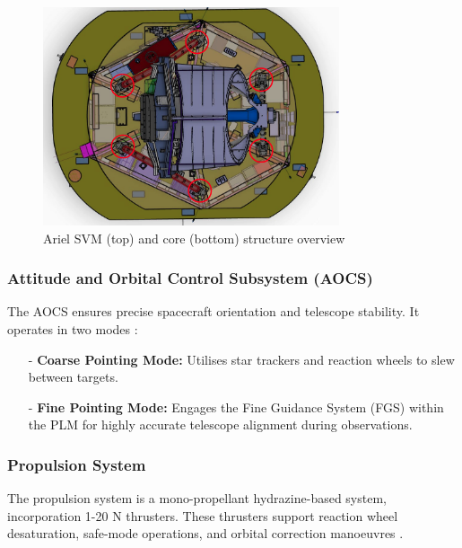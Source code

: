 \documentclass[12pt]{article}
\begin{document}
\begin{figure}[H]
\begin{minipage}{.4\textwidth}
        \vfill
        \includegraphics[width=\linewidth]{ariel core2.png}
    \end{minipage}
    \caption{\centering Ariel SVM (top) and core (bottom) structure overview \protect\cite{salvignol2024ariel}}
    \label{fig:16}
\end{figure}

\subsubsection{Attitude and Orbital Control Subsystem (AOCS)} \label{sec:4.1.2}

The AOCS ensures precise spacecraft orientation and telescope stability. It operates in two modes \cite{arielassessreport}:

\begin{itemize}
    \item[-] \textbf{Coarse Pointing Mode:} Utilises star trackers and reaction wheels to slew between targets.
    \item[-] \textbf{Fine Pointing Mode:} Engages the Fine Guidance System (FGS) within the PLM for highly accurate telescope alignment during observations.
\end{itemize}

\subsubsection{Propulsion System} \label{sec:4.1.3}

The propulsion system is a mono-propellant hydrazine-based system, incorporation 1-20 N thrusters. These thrusters support reaction wheel desaturation, safe-mode operations, and orbital correction manoeuvres \cite{arielassessreport}.
\end{document}
